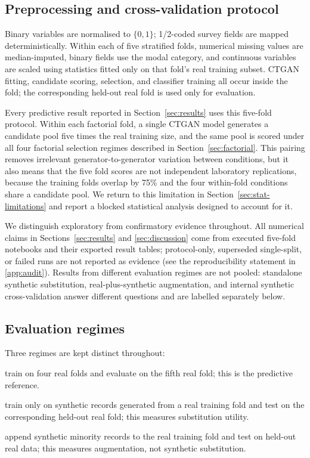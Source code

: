 \subsection{Preprocessing and cross-validation protocol}
\label{sec:preprocessing}

Binary variables are normalised to $\{0,1\}$; 1/2-coded survey fields are mapped deterministically. Within each of five stratified folds, numerical missing values are median-imputed, binary fields use the modal category, and continuous variables are scaled using statistics fitted only on that fold's real training subset. CTGAN fitting, candidate scoring, selection, and classifier training all occur inside the fold; the corresponding held-out real fold is used only for evaluation.

Every predictive result reported in Section~\ref{sec:results} uses this five-fold protocol. Within each factorial fold, a single CTGAN model generates a candidate pool five times the real training size, and the same pool is scored under all four factorial selection regimes described in Section~\ref{sec:factorial}. This pairing removes irrelevant generator-to-generator variation between conditions, but it also means that the five fold scores are not independent laboratory replications, because the training folds overlap by 75\% and the four within-fold conditions share a candidate pool. We return to this limitation in Section~\ref{sec:stat-limitations} and report a blocked statistical analysis designed to account for it.

We distinguish exploratory from confirmatory evidence throughout. All numerical claims in Sections~\ref{sec:results} and \ref{sec:discussion} come from executed five-fold notebooks and their exported result tables; protocol-only, superseded single-split, or failed runs are not reported as evidence (see the reproducibility statement in \ref{app:audit}). Results from different evaluation regimes are not pooled: standalone synthetic substitution, real-plus-synthetic augmentation, and internal synthetic cross-validation answer different questions and are labelled separately below.

\subsection{Evaluation regimes}
\label{sec:regimes}

Three regimes are kept distinct throughout:
\begin{description}[leftmargin=3.4cm,style=nextline]
\item[\ra{} (TRTR)] train on four real folds and evaluate on the fifth real fold; this is the predictive reference.
\item[\sr{} (TSTR)] train only on synthetic records generated from a real training fold and test on the corresponding held-out real fold; this measures substitution utility.
\item[\rsr{}] append synthetic minority records to the real training fold and test on held-out real data; this measures augmentation, not synthetic substitution.
\end{description}

